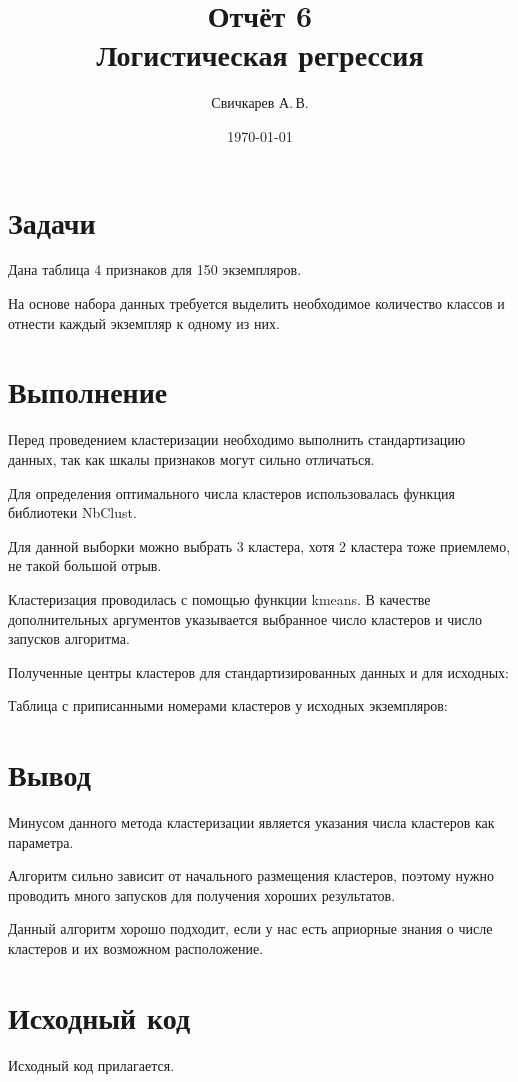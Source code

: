 \documentclass{article} %
\title{Отчёт 6\\
Логистическая регрессия} %
\author{Свичкарев А.\,В.} %
\date{\today} %
\begin{document}

\maketitle %

\section*{Задачи}
Дана таблица 4 признаков для 150 экземпляров.

На основе набора данных требуется
выделить необходимое количество классов и
отнести каждый экземпляр к одному из них.

\clearpage
\section*{Выполнение}

Перед проведением кластеризации необходимо
выполнить стандартизацию данных,
так как шкалы признаков могут сильно отличаться.

Для определения оптимального числа кластеров
использовалась функция библиотеки NbClust.


Для данной выборки можно выбрать 3 кластера,
хотя 2 кластера тоже приемлемо,
не такой большой отрыв.

Кластеризация проводилась с помощью
функции kmeans.
В качестве дополнительных аргументов
указывается выбранное число кластеров
и число запусков алгоритма.

Полученные центры кластеров
для стандартизированных данных
и для исходных:

% 

\clearpage
Таблица с приписанными номерами кластеров
у исходных экземпляров:

% 

\section*{Вывод}
Минусом данного метода кластеризации
является указания числа кластеров как параметра.

Алгоритм сильно зависит от начального
размещения кластеров,
поэтому нужно проводить много запусков
для получения хороших результатов.

Данный алгоритм хорошо подходит,
если у нас есть априорные знания
о числе кластеров и
их возможном расположение.

\section*{Исходный код}
Исходный код прилагается.
\end{document}

